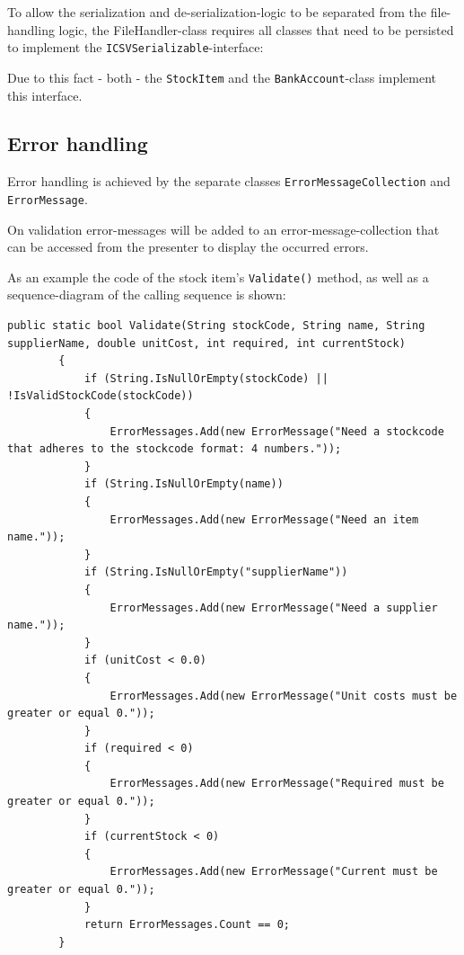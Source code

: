 To allow the serialization and de-serialization-logic to be separated from the file-handling logic, the FileHandler-class requires all classes that need to be persisted to implement the \texttt{ICSVSerializable}-interface:



Due to this fact - both - the \texttt{StockItem} and the \texttt{BankAccount}-class implement this interface.

\subsection{Error handling}
\label{subsec:error_handling}

Error handling is achieved by the separate classes \texttt{ErrorMessageCollection} and \texttt{ErrorMessage}.

On validation error-messages will be added to an error-message-collection that can be accessed from the presenter to display the occurred errors.

As an example the code of the stock item's \texttt{Validate()} method, as well as a sequence-diagram of the calling sequence is shown:

\begin{lstlisting}[caption=Validate method of StockItem]
public static bool Validate(String stockCode, String name, String supplierName, double unitCost, int required, int currentStock)
        {
            if (String.IsNullOrEmpty(stockCode) || !IsValidStockCode(stockCode))
            {
                ErrorMessages.Add(new ErrorMessage("Need a stockcode that adheres to the stockcode format: 4 numbers."));
            }
            if (String.IsNullOrEmpty(name))
            {
                ErrorMessages.Add(new ErrorMessage("Need an item name."));
            }
            if (String.IsNullOrEmpty("supplierName"))
            {
                ErrorMessages.Add(new ErrorMessage("Need a supplier name."));
            }
            if (unitCost < 0.0)
            {
                ErrorMessages.Add(new ErrorMessage("Unit costs must be greater or equal 0."));
            }
            if (required < 0)
            {
                ErrorMessages.Add(new ErrorMessage("Required must be greater or equal 0."));
            }
            if (currentStock < 0)
            {
                ErrorMessages.Add(new ErrorMessage("Current must be greater or equal 0."));
            }
            return ErrorMessages.Count == 0;
        }
\end{lstlisting}

